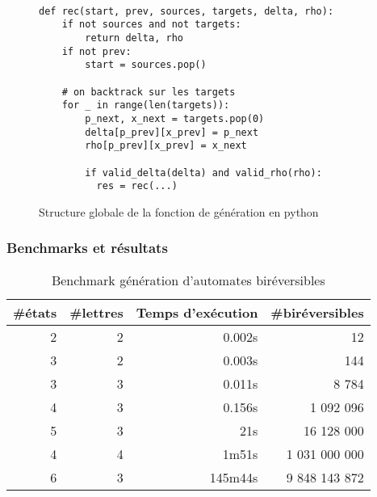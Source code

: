 \documentclass[11pt]{beamer}
\begin{document}
\begin{frame}[fragile]
\begin{figure}[!ht]
\begin{center}
\begin{Verbatim}[fontsize=\small]

def rec(start, prev, sources, targets, delta, rho):
    if not sources and not targets:
        return delta, rho
    if not prev:
    	start = sources.pop()

    # on backtrack sur les targets
    for _ in range(len(targets)):
        p_next, x_next = targets.pop(0)
        delta[p_prev][x_prev] = p_next
        rho[p_prev][x_prev] = x_next

        if valid_delta(delta) and valid_rho(rho):
          res = rec(...)
\end{Verbatim}
\end{center}
  \caption{Structure globale de la fonction de génération en python\label{fig:gen-pseudo-code}}
\end{figure}
\end{frame}

\begin{frame}
  \frametitle{Benchmarks et résultats}
  \begin{table}[h!]
  \begin{center}
    \begin{threeparttable}
      \begin{tabular}{|rrrr|}
        \hline
        \#états & \#lettres & Temps d'exécution & \#biréversibles \\ [0.5ex]
        \hline\hline
        2 & 2 & 0.002s & 12 \\
        \hline
        3 & 2 & 0.003s & 144 \\
        \hline
        3 & 3 & 0.011s & 8 784 \\
        \hline
        4 & 3 & 0.156s & 1 092 096 \\
        \hline
        5 & 3 & 21s    & 16 128 000 \\
        \hline
        4 & 4 & 1m51s  & 1 031 000 000 \\
        \hline
        6 & 3 & 145m44s& 9 848 143 872 \\
        \hline
      \end{tabular}

      \caption{Benchmark génération d'automates biréversibles}
    \end{threeparttable}
  \end{center}
\end{table}
\end{frame}
\end{document}
